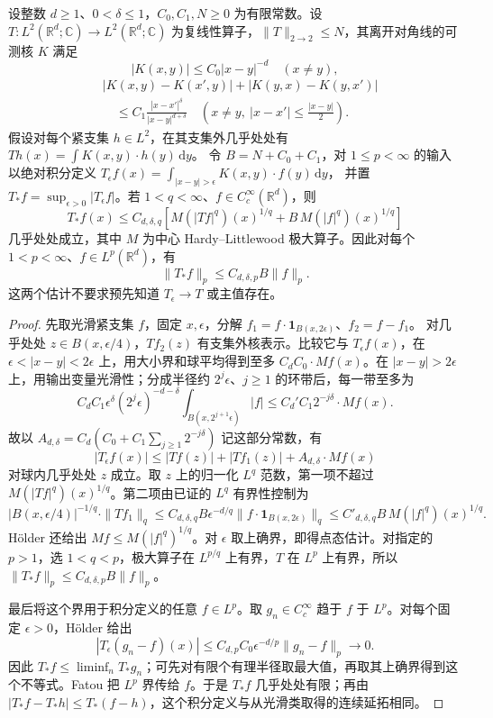 \begin{proposition}\label{b2:thm:18-maximal-truncation}
设整数 \(d\geq1\)、\(0<\delta\leq1\)，\(C_0,C_1,N\geq0\) 为有限常数。设 \(T:L^2(\mathbb R^d;\mathbb C)\to L^2(\mathbb R^d;\mathbb C)\) 为复线性算子，\(\|T\|_{2\to2}\leq N\)，其离开对角线的可测核 \(K\) 满足
\[
 |K(x,y)|\leq C_0|x-y|^{-d}\quad(x\ne y),
\]
\[
 \begin{aligned}
 &|K(x,y)-K(x',y)|+|K(y,x)-K(y,x')|\\
 &\quad\leq C_1\frac{|x-x'|^\delta}{|x-y|^{d+\delta}}
 \quad\left(x\ne y,\ |x-x'|\leq\frac{|x-y|}2\right).
 \end{aligned}
\]
假设对每个紧支集 \(h\in L^2\)，在其支集外几乎处处有
\(Th(x)=\int K(x,y)\cdot h(y)\,\mathrm dy\)。
令 \(B=N+C_0+C_1\)，对 \(1\leq p<\infty\) 的输入以绝对积分定义
\(T_\epsilon f(x)=\int_{|x-y|>\epsilon}K(x,y)\cdot f(y)\,\mathrm dy\)，
并置 \(T_*f=\sup_{\epsilon>0}|T_\epsilon f|\)。若 \(1<q<\infty\)、\(f\in C_c^\infty(\mathbb R^d)\)，则
\[
 T_*f(x)\leq C_{d,\delta,q}
 \left[M(|Tf|^q)(x)^{1/q}
       +B\,M(|f|^q)(x)^{1/q}\right]
\]
几乎处处成立，其中 \(M\) 为中心 Hardy--Littlewood 极大算子。因此对每个 \(1<p<\infty\)、\(f\in L^p(\mathbb R^d)\)，有
\[
 \|T_*f\|_p\leq C_{d,\delta,p}B\|f\|_p.
\]
这两个估计不要求预先知道 \(T_\epsilon\to T\) 或主值存在。
\end{proposition}
\begin{proof}
先取光滑紧支集 \(f\)，固定 \(x,\epsilon\)，分解
\(f_1=f\cdot\mathbf1_{B(x,2\epsilon)}\)、\(f_2=f-f_1\)。
对几乎处处 \(z\in B(x,\epsilon/4)\)，\(Tf_2(z)\) 有支集外核表示。比较它与 \(T_\epsilon f(x)\)，在 \(\epsilon<|x-y|<2\epsilon\) 上，用大小界和球平均得到至多 \(C_dC_0\cdot Mf(x)\)。在 \(|x-y|>2\epsilon\) 上，用输出变量光滑性；分成半径约 \(2^j\epsilon\)、\(j\geq1\) 的环带后，每一带至多为
\[
 C_dC_1\epsilon^\delta(2^j\epsilon)^{-d-\delta}
          \int_{B(x,2^{j+1}\epsilon)}|f|
 \leq C_d'C_1 2^{-j\delta}\cdot Mf(x).
\]
故以 \(A_{d,\delta}=C_d(C_0+C_1\sum_{j\geq1}2^{-j\delta})\) 记这部分常数，有
\[
 |T_\epsilon f(x)|\leq |Tf(z)|+|Tf_1(z)|
                       +A_{d,\delta}\cdot Mf(x)
\]
对球内几乎处处 \(z\) 成立。取 \(z\) 上的归一化 \(L^q\) 范数，第一项不超过 \(M(|Tf|^q)(x)^{1/q}\)。第二项由已证的 \(L^q\) 有界性控制为
\[
 |B(x,\epsilon/4)|^{-1/q}\cdot\|Tf_1\|_q
 \leq C_{d,\delta,q}B\epsilon^{-d/q}
                   \|f\cdot\mathbf1_{B(x,2\epsilon)}\|_q
 \leq C'_{d,\delta,q}B\,M(|f|^q)(x)^{1/q}.
\]
Hölder 还给出 \(Mf\leq M(|f|^q)^{1/q}\)。对 \(\epsilon\) 取上确界，即得点态估计。对指定的 \(p>1\)，选 \(1<q<p\)，极大算子在 \(L^{p/q}\) 上有界，\(T\) 在 \(L^p\) 上有界，所以
\(\|T_*f\|_p\leq C_{d,\delta,p}B\|f\|_p\)。

最后将这个界用于积分定义的任意 \(f\in L^p\)。取 \(g_n\in C_c^\infty\) 趋于 \(f\) 于 \(L^p\)。对每个固定 \(\epsilon>0\)，Hölder 给出
\[
 |T_\epsilon(g_n-f)(x)|
 \leq C_{d,p}C_0\epsilon^{-d/p}\|g_n-f\|_p\longrightarrow0.
\]
因此 \(T_*f\leq\liminf_nT_*g_n\)；可先对有限个有理半径取最大值，再取其上确界得到这个不等式。Fatou 把 \(L^p\) 界传给 \(f\)。于是 \(T_*f\) 几乎处处有限；再由 \(|T_*f-T_*h|\leq T_*(f-h)\)，这个积分定义与从光滑类取得的连续延拓相同。
\end{proof}

